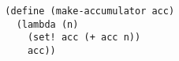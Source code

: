 \documentclass[a4paper,12pt]{article}
\begin{document}
\begin{lstlisting}
  (define (make-accumulator acc)
    (lambda (n)
      (set! acc (+ acc n))
      acc))
\end{lstlisting}
\end{document}
